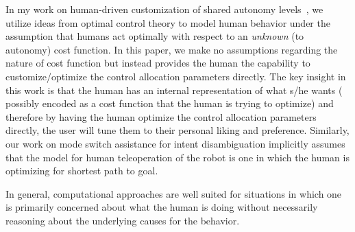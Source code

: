 \documentclass[12pt]{article}
\newcommand{\DGc}[1]{{\textbf{\color{blue}{#1}}}}
\begin{document}
In my work on human-driven customization of shared autonomy levels~\cite{gopinath2017human}, we utilize ideas from optimal control theory to model human behavior under the assumption that humans act optimally with respect to an \textit{unknown} (to autonomy) cost function. In this paper, we make no assumptions regarding the nature of cost function but instead provides the human the capability to customize/optimize the control allocation parameters directly. The key insight in this work is that the human has an internal representation of what s/he wants ( possibly encoded as a cost function that the human is trying to optimize) and therefore by having the human optimize the control allocation parameters directly, the user will tune them to their personal liking and preference. Similarly, our work on mode switch assistance for intent disambiguation implicitly assumes that the model for human teleoperation of the robot is one in which the human is optimizing for shortest path to goal.



In general, computational approaches are well suited for situations in which one is primarily concerned about what the human is doing without necessarily reasoning about the underlying causes for the behavior. 
\end{document}
